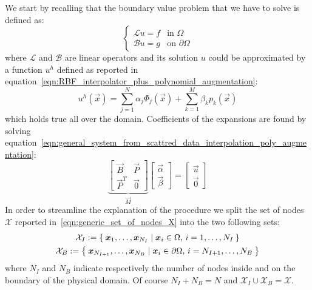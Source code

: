 We start by recalling that the boundary value problem that we have to solve is defined as:
\begin{equation}
	\label{eqn:boundary_value_problem}
	\begin{cases}
		\mathcal{L} u  = f 		 & \text{in $\Omega$} \\
		\mathcal{B} u   = g	     & \text{on $\partial\Omega$}
	\end{cases}
\end{equation}
where $\mathcal{L}$ and $\mathcal{B}$ are linear operators and its solution $u$ could be approximated by a function $u^h$ defined as reported in equation~\eqref{eqn:RBF_interpolator_plus_polynomial_augmentation}:
\begin{equation}
	\label{eqn:Kansa_interpolan}
	u^h(\vec{x}) = \sum_{j=1}^{N} \alpha_j \Phi_j(\vec{x}) + \sum_{k=1}^{M} \beta_k p_k(\vec{x})
\end{equation}
which holds true all over the domain. Coefficients of the expansions are found by solving equation~\eqref{eqn:general_system_from_scattred_data_interpolation_poly_augmentation}:
\begin{equation}
\underbrace{
	\begin{bmatrix}
		\vec{B}  & \vec{P}  \\
		\vec{P}^T  & \vec{0}
	\end{bmatrix}
}_{\vec{M}}
\begin{bmatrix}
	\vec{\alpha}  \\
	\vec{\beta}
\end{bmatrix}
=
\begin{bmatrix}
	\vec{u}  \\
	\vec{0}
\end{bmatrix}
\end{equation}
In order to streamline the explanation of the procedure we split the set of nodes $\mathcal{X}$ reported in~\eqref{eqn:generic_set_of_nodes_X} into the two following sets:
\begin{subequations}
	\begin{gather}
		\mathcal{X}_I := \Set{\boldsymbol{x}_1, \dots, \boldsymbol{x}_{N_I} \mid \boldsymbol{x}_i \in \Omega, \, i=1, \dots, N_I}  \\
		\mathcal{X}_B := \Set{\boldsymbol{x}_{N_{I+1}}, \dots, \boldsymbol{x}_{N_B} \mid \boldsymbol{x}_i \in \partial\Omega, \, i=N_{I+1}, \dots, N_B}
	\end{gather}
\end{subequations}
where $N_I$ and $N_B$ indicate respectively the number of nodes inside and on the boundary of the physical domain. Of course $N_I+N_B = N$ and $\mathcal{X}_I \cup \mathcal{X}_B = \mathcal{X}$.

